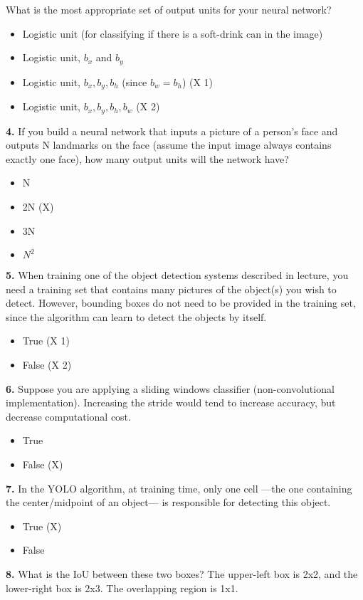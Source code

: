 What is the most appropriate set of output units for your neural network?
\begin{itemize}
    \item Logistic unit (for classifying if there is a soft-drink can in the image)
    \item Logistic unit, $b_x$ and $b_y$
    \item Logistic unit, $b_x, b_y, b_h$ (since $b_w = b_h$) (X 1)
    \item Logistic unit, $b_x, b_y, b_h, b_w$ (X 2)
\end{itemize}
\textbf{4.} If you build a neural network that inputs a picture of a person’s face and outputs N landmarks on the face (assume the input image always contains exactly one face), how many output units will the network have?
\begin{itemize}
    \item N
    \item 2N (X)
    \item 3N
    \item $N^2$
\end{itemize}
\textbf{5.} When training one of the object detection systems described in lecture, you need a training set that contains many pictures of the object(s) you wish to detect. However, bounding boxes do not need to be provided in the training set, since the algorithm can learn to detect the objects by itself.
\begin{itemize}
    \item True (X 1)
    \item False (X 2)
\end{itemize}
\textbf{6.} Suppose you are applying a sliding windows classifier (non-convolutional implementation). Increasing the stride would tend to increase accuracy, but decrease computational cost.
\begin{itemize}
    \item True
    \item False (X)
\end{itemize}
\textbf{7.} In the YOLO algorithm, at training time, only one cell ---the one containing the center/midpoint of an object--- is responsible for detecting this object.
\begin{itemize}
    \item True (X)
    \item False
\end{itemize}
\textbf{8.} What is the IoU between these two boxes? The upper-left box is 2x2, and the lower-right box is 2x3. The overlapping region is 1x1.

